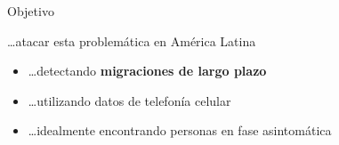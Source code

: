 \documentclass[xcolor=x11names]{beamer}
\begin{document}


\begin{frame}{Objetivo}
	\begin{block}{\ldots atacar esta problemática en América Latina}


	\begin{itemize}
		\item \ldots detectando \textbf{migraciones de largo plazo}
		\item \ldots utilizando datos de telefonía celular

		\item \ldots idealmente encontrando personas en fase asintomática
	\end{itemize}

	\end{block}
\end{frame}
\end{document}
